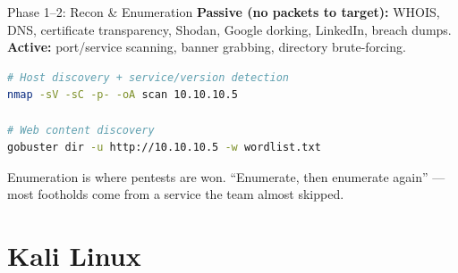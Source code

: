 \documentclass[aspectratio=169,11pt]{beamer}
\begin{document}
\begin{frame}[fragile]{Phase 1--2: Recon \& Enumeration}
  \textbf{Passive (no packets to target):} WHOIS, DNS, certificate
  transparency, Shodan, Google dorking, LinkedIn, breach dumps.
  \vspace{0.5em}
  \textbf{Active:} port/service scanning, banner grabbing, directory
  brute-forcing.
  \begin{lstlisting}[language=bash]
# Host discovery + service/version detection
nmap -sV -sC -p- -oA scan 10.10.10.5

# Web content discovery
gobuster dir -u http://10.10.10.5 -w wordlist.txt
  \end{lstlisting}
  \footnotesize Enumeration is where pentests are won. ``Enumerate, then
  enumerate again'' --- most footholds come from a service the team almost
  skipped.
\end{frame}

\section{Kali Linux}
\end{document}

